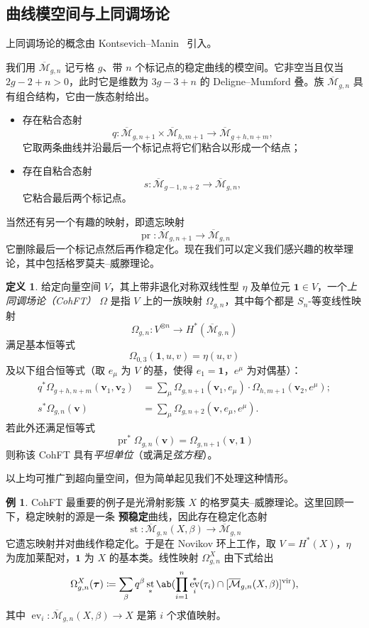 \documentclass{amsart}
\theoremstyle{definition}
\newtheorem{defn}[thm]{定义}
\newtheorem{exm}[thm]{例}
\theoremstyle{remark}
\theoremstyle{plain}
\theoremstyle{definition}
\theoremstyle{remark}
\newcommand{\Mbar}{\overline{\mathcal{M}}}
\newcommand{\mbf}[1]{\mathbf{#1}}
\newcommand{\bv}{\mbf{v}}
\newcommand{\btau}{\bm{\tau}}
\newcommand{\mr}[1]{\mathrm{#1}}
\newcommand{\1}{\mathbf{1}}
\newcommand{\2}{\mathbf{2}}
\newcommand{\3}{\mathbf{3}}
\newcommand{\vir}{\mr{vir}}
\DeclareMathOperator{\ev}{ev}
\DeclareMathOperator{\st}{st}
\DeclareMathOperator{\pr}{pr}
\begin{document}
\subsection{曲线模空间与上同调场论}%
\label{sub:Moduli of curves and CohFTs}

上同调场论的概念由 Kontsevich--Manin~\cite{KM1994} 引入。

我们用 $\Mbar_{g,n}$ 记亏格 $g$、带 $n$ 个标记点的稳定曲线的模空间。它非空当且仅当 $2g-2+n > 0$，此时它是维数为 $3g-3+n$ 的 Deligne–Mumford 叠。族 $\Mbar_{g,n}$ 具有组合结构，它由一族态射给出。
\begin{itemize}
    \item 存在粘合态射
        \[q \colon \Mbar_{g,n+1} \times \Mbar_{h, m+1} \to \Mbar_{g+h,n+m}, \]
        它取两条曲线并沿最后一个标记点将它们粘合以形成一个结点；
    \item 存在自粘合态射 \[s \colon \Mbar_{g-1,n+2} \to \Mbar_{g,n},\]
        它粘合最后两个标记点。
\end{itemize}
当然还有另一个有趣的映射，即遗忘映射
\[ \pr \colon \Mbar_{g,n+1} \to \Mbar_{g,n} \]
它删除最后一个标记点然后再作稳定化。现在我们可以定义我们感兴趣的枚举理论，其中包括格罗莫夫–威滕理论。

\begin{defn}
    给定向量空间 $V$，其上带非退化对称双线性型 $\eta$ 及单位元 $\1 \in V$，一个\textit{上同调场论（CohFT）} $\Omega$ 是指 $V$ 上的一族映射 $\Omega_{g,n}$，其中每个都是 $S_n$-等变线性映射
    \[ \Omega_{g,n} \colon V^{\otimes n} \to H^*(\Mbar_{g,n}) \]
    满足基本恒等式
    \[ \Omega_{0,3}(\1, u,v) = \eta(u,v) \]
    及以下组合恒等式（取 $e_{\mu}$ 为 $V$ 的基，使得 $e_1 = \1$，$e^{\mu}$ 为对偶基）：
    \begin{align*}
        q^* \Omega_{g+h,n+m}(\bv_1, \bv_2) &= \sum_{\mu} \Omega_{g,n+1}(\bv_1, e_{\mu}) \cdot \Omega_{h,m+1}(  \bv_2, e^{\mu} ); \\
        s^* \Omega_{g,n}(\bv) &= \sum_{\mu} \Omega_{g,n+2}(\bv, e_{\mu}, e^{\mu}).
    \end{align*}
    若此外还满足恒等式
    \[ \pr^*\Omega_{g,n}(\bv) = \Omega_{g,n+1}(\bv,\1) \]
    则称该 CohFT 具有\textit{平坦单位}（或满足\textit{弦方程}）。
\end{defn}
以上均可推广到超向量空间，但为简单起见我们不处理这种情形。

\begin{exm}
    CohFT 最重要的例子是光滑射影簇 $X$ 的格罗莫夫–威滕理论。这里回顾一下，稳定映射的源是一条 \textbf{预稳定}曲线，因此存在稳定化态射
    \[ \st \colon \Mbar_{g,n}(X,\beta) \to \Mbar_{g,n} \]
    它遗忘映射并对曲线作稳定化。于是在 Novikov 环上工作，取 $V = H^*(X)$，$\eta$ 为庞加莱配对，$\1$ 为 $X$ 的基本类。线性映射 $\Omega^X_{g,n}$ 由下式给出
    \[ \Omega_{g,n}^X(\btau) \coloneqq \sum_{\beta} q^{\beta} \st_* \ab(\prod_{i=1}^n \ev_i^*(\tau_i) \cap [\Mbar_{g,n}(X,\beta)]^{\vir}), \]
    其中 $\ev_i \colon \Mbar_{g,n}(X,\beta) \to X$ 是第 $i$ 个求值映射。
\end{exm}
\end{document}
